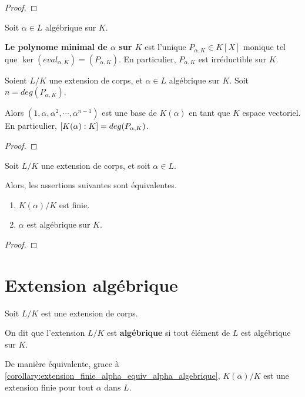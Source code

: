 \ifdefined\outputproof
\begin{proof}

\end{proof}
\fi

\begin{definition} 
	Soit $\alpha \in L$ algébrique sur $K$.

	\textbf{Le polynome minimal de $\alpha$ sur $K$} est l'unique $P_{\alpha, K}
	\in K[X]$ monique tel que $\ker{(eval_{\alpha, K})} = (P_{\alpha, K})$. En
	particulier, $P_{\alpha, K}$ est irréductible sur $K$.
\end{definition}

\begin{proposition}
	Soient $L/K$ une extension de corps, et $\alpha \in L$ algébrique sur $K$.
	Soit $n = deg(P_{\alpha, K})$.

	Alors $(1, \alpha, \alpha^{2}, \cdots, \alpha^{n - 1})$ est une base de
	$K(\alpha)$ en tant que $K$ espace vectoriel. En particulier,
	$[K(\alpha) : K] = deg(P_{\alpha, K})$.
\end{proposition}

\ifdefined\outputproof
\begin{proof}

\end{proof}
\fi

\begin{corollary}
	\label{corollary:extension_finie_alpha_equiv_alpha_algebrique}
	Soit $L/K$ une extension de corps, et soit $\alpha \in L$.

	Alors, les assertions suivantes sont équivalentes.

	\begin{enumerate}
		\item $K(\alpha)/K$ est finie.
		\item $\alpha$ est algébrique sur $K$.
	\end{enumerate}
\end{corollary}

\ifdefined\outputproof
\begin{proof}

\end{proof}
\fi

\section{Extension algébrique}

\begin{definition} 
	Soit $L/K$ est une extension de corps.

	On dit que l'extension $L/K$ est
	\textbf{algébrique} si tout élément de $L$ est algébrique sur $K$.

	De manière équivalente, grace à
	\ref{corollary:extension_finie_alpha_equiv_alpha_algebrique}, $K(\alpha)/K$
	est une extension finie pour tout $\alpha$ dans $L$.
\end{definition}

